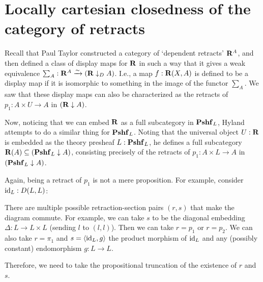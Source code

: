 \section{Locally cartesian closedness of the category of retracts}

Recall that Paul Taylor constructed a category of `dependent retracts' $ \mathbf{R}^A $, and then defined a class of display maps for $ \mathbf{R} $ in such a way that it gives a weak equivalence $ \sum_A : \mathbf{R}^A \xrightarrow{\sim} (\mathbf{R} \downarrow_D A) $. I.e., a map $ f: \mathbf{R}(X, A) $ is defined to be a display map if it is isomorphic to something in the image of the functor $ \sum_A $. We saw that these display maps can also be characterized as the retracts of $ p_1: A \times U \to A $ in $ (\mathbf{R} \downarrow A) $.

Now, noticing that we can embed $ \mathbf{R} $ as a full subcategory in $ \mathbf{Pshf}_{L} $, Hyland attempts to do a similar thing for $ \mathbf{Pshf}_{L} $. Noting that the universal object $ U : \mathbf{R} $ is embedded as the theory presheaf $ L : \mathbf{Pshf}_{L} $, he defines a full subcategory $ \mathbf{R}(A) \subseteq (\mathbf{Pshf}_{L} \downarrow A) $, consisting precisely of the retracts of $ p_1: A \times L \to A $ in $ (\mathbf{Pshf}_{L} \downarrow A) $.

\begin{remark}
  Again, being a retract of $ p_1 $ is not a mere proposition. For example, consider $ \text{id}_{L} : D(L, L) $:
  \begin{center}
  \end{center}
  There are multiple possible retraction-section pairs $ (r, s) $ that make the diagram commute. For example, we can take $ s $ to be the diagonal embedding $ \Delta : L \to L \times L $ (sending $ l $ to $ (l, l) $). Then we can take $ r = p_1 $ or $ r = p_2 $. We can also take $ r = \pi_1 $ and $ s = \langle \text{id}_{L}, g \rangle $ the product morphism of $ \text{id}_{L} $ and any (possibly constant) endomorphism $ g: L \to L $.

  Therefore, we need to take the propositional truncation of the existence of $ r $ and $ s $.
\end{remark}

